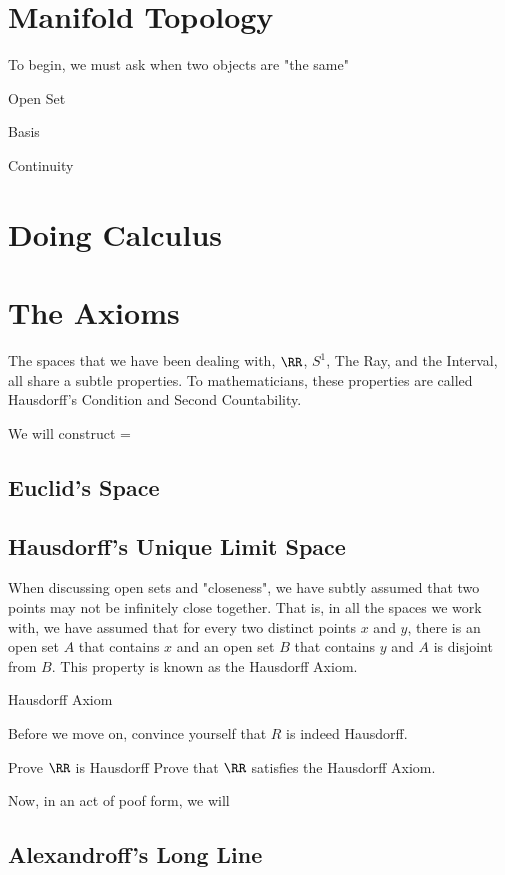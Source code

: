 \section{Manifold Topology}
To begin, we must ask when two objects are "the same"
\begin{boxDefinition}{Open Set}
\end{boxDefinition}
\begin{boxDefinition}{Basis}
\end{boxDefinition}
\begin{boxDefinition}{Continuity}
\end{boxDefinition}
\begin{boxDefinition}{}
\end{boxDefinition}
\section{Doing Calculus}

\section{The Axioms}
The spaces that we have been dealing with, \( \RR \), \( S^1 \), The Ray, and the Interval, 
    all share a subtle properties.
To mathematicians,
    these properties are called Hausdorff's Condition and Second Countability.

We will construct =
\subsection{Euclid's Space}
\subsection{Hausdorff's Unique Limit Space}
When discussing open sets and "closeness",
    we have subtly assumed that two points may not be infinitely close together.
That is,
    in all the spaces we work with,
    we have assumed that for every two distinct points \( x \) and \( y \),
    there is an open set \( A \) that contains \( x \) and an open set \( B \) that contains \( y \) and \( A \) is disjoint from \( B \).
This property is known as the Hausdorff Axiom.
\begin{boxDefinition}{Hausdorff Axiom}
\end{boxDefinition}
Before we move on, convince yourself that \( R \) is indeed Hausdorff.
\begin{boxProblem}{Prove \( \RR \) is Hausdorff}
Prove that \( \RR \) satisfies the Hausdorff Axiom.
\end{boxProblem}

Now, in an act of poof form, we will 



\subsection{Alexandroff's Long Line}
